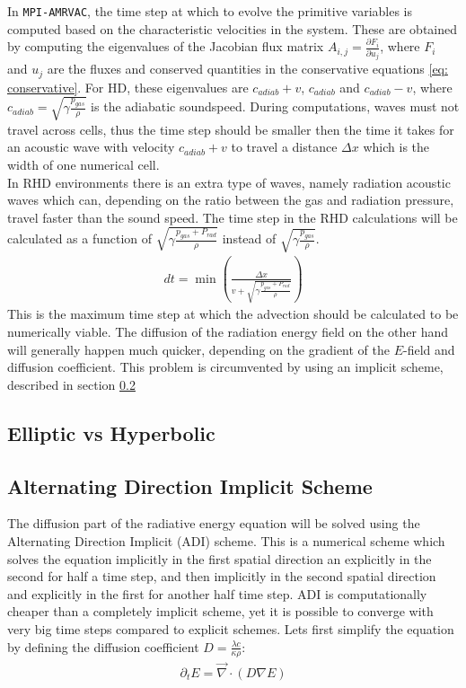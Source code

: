 In \texttt{MPI-AMRVAC}, the time step at which to evolve the primitive variables is computed based on the characteristic velocities in the system. These are obtained by computing the eigenvalues of the Jacobian flux matrix $A_{i,j} = \frac{\partial F_i}{\partial u_j}$, where $F_i$ and $u_j$ are the fluxes and conserved quantities in the conservative equations \eqref{eq: conservative}. For HD, these eigenvalues are $c_{adiab} + v$, $c_{adiab}$ and $c_{adiab} - v$, where $c_{adiab} = \sqrt{\gamma\frac{p_{gas}}{\rho}}$ is the adiabatic soundspeed. During computations, waves must not travel across cells, thus the time step should be smaller then the time it takes for an acoustic wave with velocity $c_{adiab} + v$ to travel a distance $\Delta x$ which is the width of one numerical cell.\\

In RHD environments there is an extra type of waves, namely radiation acoustic waves \citep{Mihalas1984a} which can, depending on the ratio between the gas and radiation pressure, travel faster than the sound speed. The time step in the RHD calculations will be calculated as a function of $\sqrt{\gamma\frac{p_{gas} + P_{rad}}{\rho}}$ instead of $\sqrt{\gamma\frac{p_{gas}}{\rho}}$.
\begin{align}
dt = \min \left(\frac{\Delta x}{v + \sqrt{\gamma\frac{p_{gas} + P_{rad}}{\rho}}} \right)
\end{align}
This is the maximum time step at which the advection should be calculated to be numerically viable. The diffusion of the radiation energy field on the other hand will generally happen much quicker, depending on the gradient of the $E$-field and diffusion coefficient. This problem is circumvented by using an implicit scheme, described in section \ref{section: m: ADI}

\subsection{Elliptic vs Hyperbolic}
\subsection{Alternating Direction Implicit Scheme} \label{section: m: ADI}
The diffusion part of the radiative energy equation will be solved using the Alternating Direction Implicit (ADI) scheme. This is a numerical scheme which solves the equation implicitly in the first spatial direction an explicitly in the second for half a time step, and then implicitly in the second spatial direction and explicitly in the first for another half time step. ADI is computationally cheaper than a completely implicit scheme, yet it is possible to converge with very big time steps compared to explicit schemes. Lets first simplify the equation by defining the diffusion coefficient $D = \frac{\lambda c}{\kappa \rho}$:
\begin{align}
\partial_t E  = \vec{\nabla} \cdot \left(D \nabla E\right) \label{eq: diffusion}
\end{align}

